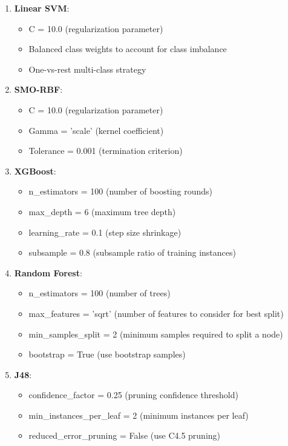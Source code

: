 \begin{enumerate}
    \item \textbf{Linear SVM}:
    \begin{itemize}
        \item C = 10.0 (regularization parameter)
        \item Balanced class weights to account for class imbalance
        \item One-vs-rest multi-class strategy
    \end{itemize}
    
    \item \textbf{SMO-RBF}:
    \begin{itemize}
        \item C = 10.0 (regularization parameter)
        \item Gamma = 'scale' (kernel coefficient)
        \item Tolerance = 0.001 (termination criterion)
    \end{itemize}
    
    \item \textbf{XGBoost}:
    \begin{itemize}
        \item n\_estimators = 100 (number of boosting rounds)
        \item max\_depth = 6 (maximum tree depth)
        \item learning\_rate = 0.1 (step size shrinkage)
        \item subsample = 0.8 (subsample ratio of training instances)
    \end{itemize}
    
    \item \textbf{Random Forest}:
    \begin{itemize}
        \item n\_estimators = 100 (number of trees)
        \item max\_features = 'sqrt' (number of features to consider for best split)
        \item min\_samples\_split = 2 (minimum samples required to split a node)
        \item bootstrap = True (use bootstrap samples)
    \end{itemize}
    
    \item \textbf{J48}:
    \begin{itemize}
        \item confidence\_factor = 0.25 (pruning confidence threshold)
        \item min\_instances\_per\_leaf = 2 (minimum instances per leaf)
        \item reduced\_error\_pruning = False (use C4.5 pruning)
    \end{itemize}
\end{enumerate}

